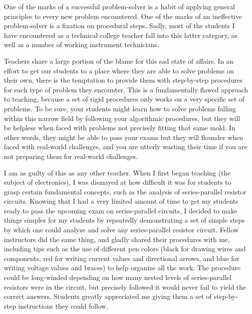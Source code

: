 One of the marks of a successful problem-solver is a habit of applying general principles to every new problem encountered.  One of the marks of an ineffective problem-solver is a fixation on procedural steps.  Sadly, most of the students I have encountered as a technical college teacher fall into this latter category, as well as a number of working instrument technicians.

Teachers share a large portion of the blame for this sad state of affairs.  In an effort to get our students to a place where they are able to solve problems on their own, there is the temptation to provide them with step-by-step procedures for each type of problem they encounter.  This is a fundamentally flawed approach to teaching, because a set of rigid procedures only works on a very specific set of problems.  To be sure, your students might learn how to solve problems falling within this narrow field by following your algorithmic procedures, but they will be helpless when faced with problems not precisely fitting that same mold.  In other words, they might be able to pass your exams but they will flounder when faced with real-world challenges, and you are utterly wasting their time if you are not preparing them for real-world challenges.

\vskip 10pt

I am as guilty of this as any other teacher.  When I first began teaching (the subject of electronics), I was dismayed at how difficult it was for students to grasp certain fundamental concepts, such as the analysis of series-parallel resistor circuits.  Knowing that I had a very limited amount of time to get my students ready to pass the upcoming exam on series-parallel circuits, I decided to make things simpler for my students by repeatedly demonstrating a set of simple steps by which one could analyze and solve any series-parallel resistor circuit.  Fellow instructors did the same thing, and gladly shared their procedures with me, including tips such as the use of different pen colors (black for drawing wires and components, red for writing current values and directional arrows, and blue for writing voltage values and braces) to help organize all the work.  The procedure could be long-winded depending on how many nested levels of series-parallel resistors were in the circuit, but precisely followed it would never fail to yield the correct answers.  Students greatly appreciated me giving them a set of step-by-step instructions they could follow.

